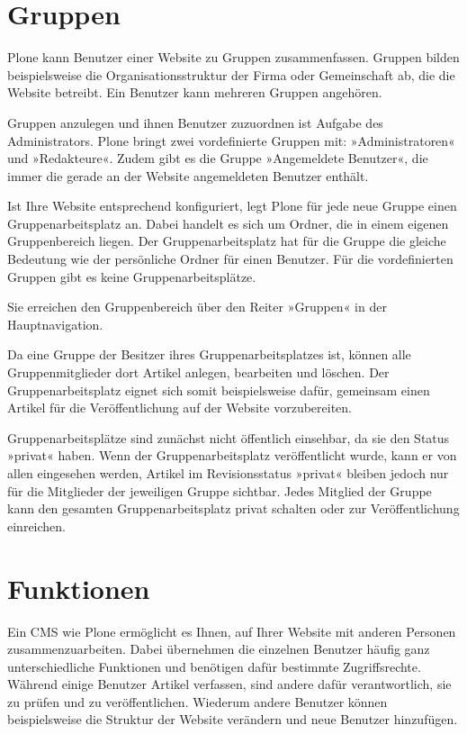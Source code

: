 \documentclass[a4paper,12pt,ngerman]{manual}
\begin{document}
\hypertarget{sec-gruppen}{}\section{Gruppen}

Plone kann Benutzer einer Website zu Gruppen zusammenfassen. Gruppen bilden
beispielsweise die Organisationsstruktur der Firma oder Gemeinschaft ab, die
die Website betreibt. Ein Benutzer kann mehreren Gruppen angehören.

Gruppen anzulegen und ihnen Benutzer zuzuordnen ist Aufgabe des
Administrators. Plone bringt zwei vordefinierte Gruppen mit:
»Administratoren« und »Redakteure«. Zudem gibt es die Gruppe »Angemeldete
Benutzer«, die immer die gerade an der Website angemeldeten Benutzer enthält.

Ist Ihre Website entsprechend konfiguriert, legt Plone für jede neue Gruppe
einen Gruppenarbeitsplatz an. Dabei handelt es sich um Ordner, die in einem
eigenen Gruppenbereich liegen. Der Gruppenarbeitsplatz hat für die Gruppe die
gleiche Bedeutung wie der persönliche Ordner für einen Benutzer. Für die
vordefinierten Gruppen gibt es keine Gruppenarbeitsplätze.

Sie erreichen den Gruppenbereich über den Reiter »Gruppen« in der
Hauptnavigation.

Da eine Gruppe der Besitzer ihres Gruppenarbeitsplatzes ist, können alle
Gruppenmitglieder dort Artikel anlegen, bearbeiten und löschen. Der
Gruppenarbeitsplatz eignet sich somit beispielsweise dafür, gemeinsam einen
Artikel für die Veröffentlichung auf der Website vorzubereiten.

Gruppenarbeitsplätze sind zunächst nicht öffentlich einsehbar, da sie
den Status »privat« haben. Wenn der Gruppenarbeitsplatz veröffentlicht
wurde, kann er von allen eingesehen werden, Artikel im Revisionsstatus
»privat« bleiben jedoch nur für die Mitglieder der jeweiligen Gruppe
sichtbar. Jedes Mitglied der Gruppe kann den gesamten
Gruppenarbeitsplatz privat schalten oder zur Veröffentlichung
einreichen.

\resetcurrentobjects
\hypertarget{--doc-benutzer/rollen}{}

\hypertarget{sec-benutzer-rollen}{}\section{Funktionen}

Ein CMS wie Plone ermöglicht es Ihnen, auf Ihrer Website mit anderen
Personen zusammenzuarbeiten. Dabei übernehmen die einzelnen Benutzer
häufig ganz unterschiedliche Funktionen und benötigen dafür bestimmte
Zugriffsrechte. Während einige Benutzer Artikel verfassen, sind andere
dafür verantwortlich, sie zu prüfen und zu veröffentlichen. Wiederum
andere Benutzer können beispielsweise die Struktur der Website
verändern und neue Benutzer hinzufügen.
\end{document}
